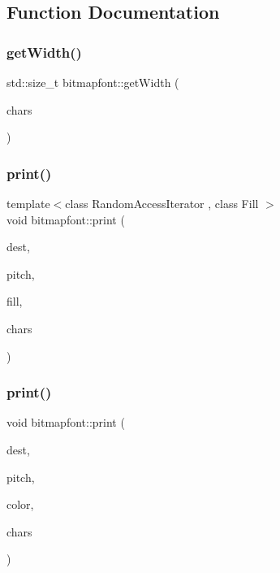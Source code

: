 \subsection{Function Documentation}
\mbox{\label{namespacebitmapfont_a682473073f936accda9fd8ef3c585cf8}} 
\subsubsection{\texorpdfstring{get\+Width()}{getWidth()}}
{\footnotesize\ttfamily std\+::size\+\_\+t bitmapfont\+::get\+Width (\begin{DoxyParamCaption}\item[{char const $\ast$}]{chars }\end{DoxyParamCaption})}

\mbox{\label{namespacebitmapfont_a69a6043b076e5288453f3eae8ae59645}} 
\subsubsection{\texorpdfstring{print()}{print()}\hspace{0.1cm}{\footnotesize\ttfamily [1/2]}}
{\footnotesize\ttfamily template$<$class Random\+Access\+Iterator , class Fill $>$ \\
void bitmapfont\+::print (\begin{DoxyParamCaption}\item[{Random\+Access\+Iterator}]{dest,  }\item[{std\+::ptrdiff\+\_\+t}]{pitch,  }\item[{Fill}]{fill,  }\item[{char const $\ast$}]{chars }\end{DoxyParamCaption})}

\mbox{\label{namespacebitmapfont_a2512dfd9a49deea691d466d40408e182}} 
\subsubsection{\texorpdfstring{print()}{print()}\hspace{0.1cm}{\footnotesize\ttfamily [2/2]}}
{\footnotesize\ttfamily void bitmapfont\+::print (\begin{DoxyParamCaption}\item[{\hyperlink{namespacegambatte_a0639f09fccfbbd5a8e0796318768e370}{gambatte\+::uint\+\_\+least32\+\_\+t} $\ast$}]{dest,  }\item[{std\+::ptrdiff\+\_\+t}]{pitch,  }\item[{uint\+\_\+least32\+\_\+t}]{color,  }\item[{char const $\ast$}]{chars }\end{DoxyParamCaption})}

